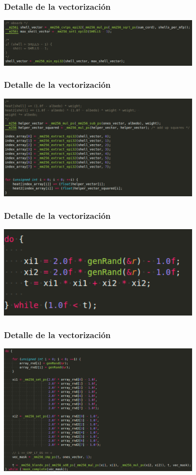 \documentclass{beamer}
\begin{document}
\begin{frame}
    \frametitle{Detalle de la vectorización}
    \includegraphics[width=4in]{imagenes/detalle_vec6.png}    
\end{frame}

\begin{frame}
    \frametitle{Detalle de la vectorización}
    \includegraphics[width=4in]{imagenes/detalle_vec7.png}    
\end{frame}

\begin{frame}
    \frametitle{Detalle de la vectorización}
    \includegraphics[width=4in]{imagenes/comp_tinymc3.png}
\end{frame}

\begin{frame}
    \frametitle{Detalle de la vectorización}
    \includegraphics[width=4in]{imagenes/det_vec8.png}
\end{frame}
\end{document}
